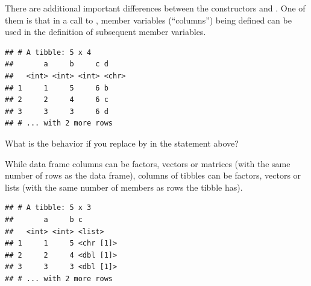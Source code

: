 \documentclass[krantz2]{krantz}\usepackage{knitr}
\begin{document}
There are additional important differences between the constructors  and . One of them is that in a call to , member variables (``columns'')  being defined can be used in the definition of subsequent member variables.

\begin{knitrout}\footnotesize
{}\color{fgcolor}\begin{kframe}
\begin{alltt}
\hlstd{(} \hlstd{=} \hlopt{:}\hlstd{,}  \hlstd{=} \hlopt{:}\hlstd{,}   \hlopt{+}   \hlstd{= letters[a} \hlopt{+} \hlstd{])}
\end{alltt}
\begin{verbatim}
## # A tibble: 5 x 4
##       a     b     c d    
##   <int> <int> <int> <chr>
## 1     1     5     6 b    
## 2     2     4     6 c    
## 3     3     3     6 d    
## # ... with 2 more rows
\end{verbatim}
\end{kframe}
\end{knitrout}

\begin{playground}
What is the behavior if you replace  by  in the statement above?
\end{playground}

While data frame columns can be factors, vectors or matrices (with the same number of rows as the data frame), columns of tibbles can be factors, vectors or lists (with the same number of members as rows the tibble has).

\begin{knitrout}\footnotesize
{}\color{fgcolor}\begin{kframe}
\begin{alltt}
\hlstd{(} \hlstd{=} \hlopt{:}\hlstd{,}  \hlstd{=} \hlopt{:}\hlstd{,}  \hlstd{=} \hlstd{(}\hlstd{,} \hlstd{,} \hlstd{,} \hlstd{,} \hlstd{))}
\end{alltt}
\begin{verbatim}
## # A tibble: 5 x 3
##       a     b c        
##   <int> <int> <list>   
## 1     1     5 <chr [1]>
## 2     2     4 <dbl [1]>
## 3     3     3 <dbl [1]>
## # ... with 2 more rows
\end{verbatim}
\end{kframe}
\end{knitrout}
\end{document}

